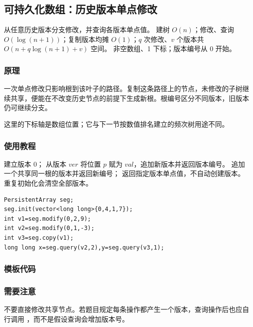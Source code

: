 \subsection{可持久化数组：历史版本单点修改}
\label{ds:persistent-array}
\AlgorithmInfo
    {从任意历史版本分支修改，并查询各版本单点值。}
    {建树 $O(n)$；修改、查询 $O(\log(n+1))$；复制版本均摊 $O(1)$；$q$ 次修改、$v$ 个版本共 $O(n+q\log(n+1)+v)$ 空间。}
    {非空数组、1 下标；版本编号从 0 开始。}
\subsubsection*{原理}
一次单点修改只影响根到该叶子的路径。复制这条路径上的节点，未修改的子树继续共享，便能在不改变历史节点的前提下生成新根。根编号区分不同版本，旧版本仍可继续分支。

这里的下标轴是数组位置；它与下一节按数值排名建立的频次树用途不同。

\subsubsection*{使用教程}
 建立版本 0； 从版本 $ver$ 将位置 $p$ 赋为 $val$，追加新版本并返回版本编号。 追加一个共享同一根的版本并返回新编号； 返回指定版本单点值，不自动创建版本。重复初始化会清空全部版本。
\begin{lstlisting}[style=mtycpp,numbers=none]
PersistentArray seg;
seg.init(vector<long long>{0,4,1,7});
int v1=seg.modify(0,2,9);
int v2=seg.modify(0,1,-3);
int v3=seg.copy(v1);
long long x=seg.query(v2,2),y=seg.query(v3,1);
\end{lstlisting}
\subsubsection*{模板代码}
\subsubsection*{需要注意}
不要直接修改共享节点。若题目规定每条操作都产生一个版本，查询操作后也应自行调用 ，而不是假设查询会增加版本号。
